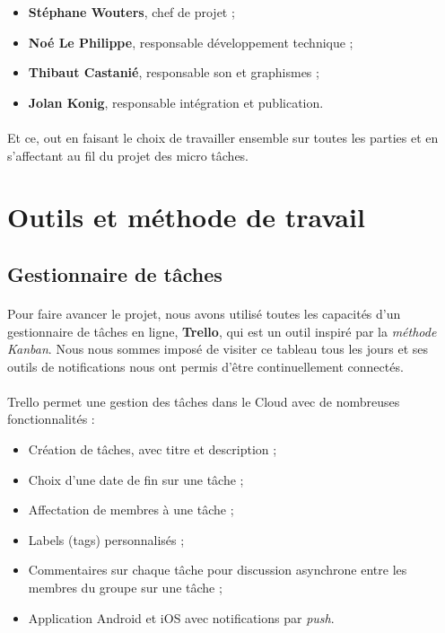 \begin{itemize}
\item \textbf{Stéphane Wouters}, chef de projet ;
\item \textbf{Noé Le Philippe}, responsable développement technique ;
\item \textbf{Thibaut Castanié}, responsable son et graphismes ;
\item \textbf{Jolan Konig}, responsable intégration et publication.
\end{itemize}

\paragraph{}
Et ce, out en faisant le choix de travailler ensemble sur toutes les parties et en s’affectant au fil du projet des micro tâches.

\section{Outils et méthode de travail}

\subsection{Gestionnaire de tâches}

\paragraph{}
Pour faire avancer le projet, nous avons utilisé toutes les capacités d’un gestionnaire de tâches en ligne, \textbf{Trello}, qui est un outil inspiré par la \textit{méthode Kanban}. Nous nous sommes imposé de visiter ce tableau tous les jours et ses outils de notifications nous ont permis d’être continuellement connectés.

\paragraph{}
Trello permet une gestion des tâches dans le Cloud avec de nombreuses fonctionnalités :
\begin{itemize}
\item Création de tâches, avec titre et description ;
\item Choix d’une date de fin sur une tâche ;
\item Affectation de membres à une tâche ;
\item Labels (tags) personnalisés ;
\item Commentaires sur chaque tâche pour discussion asynchrone entre les membres du groupe sur une tâche ;
\item Application Android et iOS avec notifications par \textit{push}.
\end{itemize}

